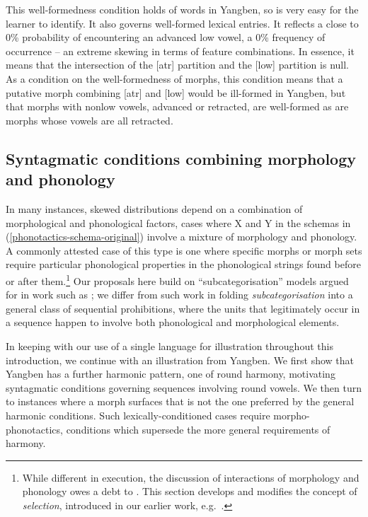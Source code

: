 This well-formedness condition holds of words in Yangben, so is very easy for the learner to identify. It also  governs well-formed lexical entries. It reflects a close to 0\% probability of encountering an advanced low vowel, a 0\% frequency of occurrence -- an extreme skewing in terms of feature combinations. In essence, it means that the intersection of the [atr] partition and the [low] partition is null. As a condition on the well-formedness  of morphs, this condition means that  a putative morph combining [atr] and [low] would be ill-formed in Yangben, but that morphs with nonlow vowels, advanced or retracted, are well-formed as are morphs whose vowels are all retracted. 


\subsection{Syntagmatic conditions combining morphology and phonology}\label{section-Yangben-morpho-phonotactics}\label{section-morpho-phonotactics}

In many instances, skewed distributions depend on a combination of morphological and phonological factors, cases where X and Y in the schemas in (\ref{phonotactics-schema-original}) involve a mixture of morphology and phonology. A commonly attested case of this type is one where specific morphs or morph sets require particular phonological properties in the phonological strings found before or after them.\footnote{While different in execution, the discussion of interactions of morphology and phonology owes a debt to \citet{Ford+:1983}. This section develops and modifies the concept of \textit{selection}, introduced in our earlier work, e.g.\ \citet{Archangeli+:2018routledge}.} Our proposals here build on ``subcategorisation'' models argued for in work such as \citet{Lieber:1980, Yu:2007-infixation, Paster:2009, Paster:2015}; we differ from such work in folding {\it subcategorisation} into a general class of sequential prohibitions, where the units that legitimately occur in a sequence happen to involve both phonological and morphological elements.

In keeping with our use of a single language for illustration throughout this introduction, we continue with an illustration from Yangben.  We first show that Yangben has a further harmonic pattern, one of round harmony, motivating syntagmatic conditions governing sequences involving round vowels. We then turn to instances where a morph surfaces that is not  the one preferred by the general harmonic conditions. Such lexically-conditioned cases require morpho-phonotactics, conditions which supersede the more general requirements of harmony.

